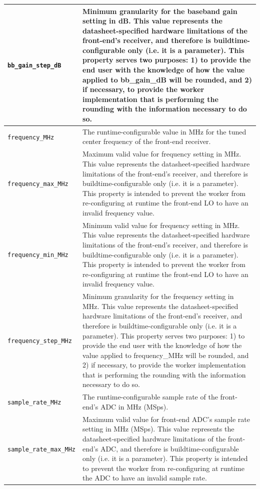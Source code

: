 \begin{longtable}{|p{5cm}|p{12cm}|}
			\hline
			\verb+bb_gain_step_dB+              & Minimum granularity for the baseband gain setting in dB. This value represents the datasheet-specified hardware limitations of the front-end's receiver, and therefore is buildtime-configurable only (i.e. it is a parameter). This property serves two purposes: 1) to provide the end user with the knowledge of how the value applied to bb\_gain\_dB will be rounded, and 2) if necessary, to provide the worker implementation that is performing the rounding with the information necessary to do so. \\
			\hline
			\verb+frequency_MHz+                & The runtime-configurable value in MHz for the tuned center frequency of the front-end receiver. \\
			\hline
			\verb+frequency_max_MHz+            & Maximum valid value for frequency setting in MHz. This value represents the datasheet-specified hardware limitations of the front-end's receiver, and therefore is buildtime-configurable only (i.e. it is a parameter). This property is intended to prevent the worker from re-configuring at runtime the front-end LO to have an invalid frequency value. \\
			\hline
			\verb+frequency_min_MHz+            & Minimum valid value for frequency setting in MHz. This value represents the datasheet-specified hardware limitations of the front-end's receiver, and therefore is buildtime-configurable only (i.e. it is a parameter). This property is intended to prevent the worker from re-configuring at runtime the front-end LO to have an invalid frequency value. \\
			\hline
			\verb+frequency_step_MHz+           & Minimum granularity for the frequency setting in MHz. This value represents the datasheet-specified hardware limitations of the front-end's receiver, and therefore is buildtime-configurable only (i.e. it is a parameter). This property serves two purposes: 1) to provide the end user with the knowledge of how the value applied to frequency\_MHz will be rounded, and 2) if necessary, to provide the worker implementation that is performing the rounding with the information necessary to do so. \\
			\hline
			\verb+sample_rate_MHz+              & The runtime-configurable sample rate of the front-end's ADC in MHz (MSps).                  \\
			\hline
			\verb+sample_rate_max_MHz+          & Maximum valid value for front-end ADC's sample rate setting in MHz (MSps). This value represents the datasheet-specified hardware limitations of the front-end's ADC, and therefore is buildtime-configurable only (i.e. it is a parameter). This property is intended to prevent the worker from re-configuring at runtime the ADC to have an invalid sample rate. \\

\end{longtable}
